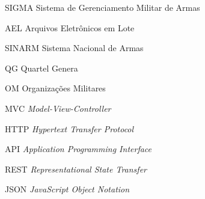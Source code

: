 \begin{siglas}
  \item[SIGMA] Sistema de Gerenciamento Militar de Armas
  \item[AEL] Arquivos Eletrônicos em Lote 
  \item[SINARM] Sistema Nacional de Armas 
  \item[QG] Quartel Genera
  \item[OM] Organizações Militares
  \item[MVC] \textit{Model-View-Controller}
  \item[HTTP] \textit{Hypertext Transfer Protocol}
  \item[API] \textit{Application Programming Interface}
  \item[REST] \textit{Representational State Transfer}
  \item[JSON] \textit{JavaScript Object Notation}
  
\end{siglas}